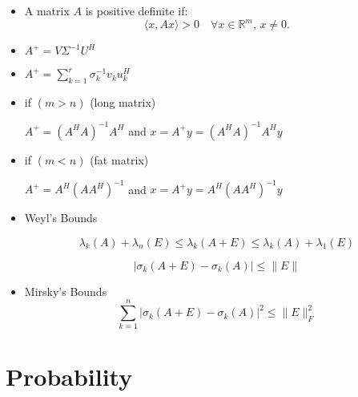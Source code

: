 \documentclass{article}
\begin{document}
\begin{itemize}
 \item A matrix $A$ is positive definite if:
        \[
        \langle x, Ax \rangle > 0 \quad \forall x \in \mathbb{R}^m, \, x \neq 0.
        \]



\item 
   $
    A^+ = V \Sigma^{-1} U^H
   $


\item 
$
A^+ = \sum_{k=1}^{r} \sigma_k^{-1} v_k u_k^H
$


\item if $(m > n)$ (long matrix)

    $
    A^+ = (A^H A)^{-1} A^H
    $ and $x = A^+y = (A^H A)^{-1} A^Hy$

\item if $(m < n)$ (fat matrix)

$
 A^+ = A^H(AA^H)^{-1}
$ and $x = A^+y = A^H(AA^H)^{-1}y$

\item Weyl's Bounds

\[
\lambda_k(A) + \lambda_n(E) \leq \lambda_k(A + E) \leq \lambda_k(A) + \lambda_1(E)
\]

\[
\lvert \sigma_k(A + E) - \sigma_k(A) \rvert \leq \lVert E \rVert
\]


\item Mirsky's Bounds
\[
\sum_{k=1}^{n} \lvert \sigma_k(A + E) - \sigma_k(A) \rvert^2 \leq \lVert E \rVert_F^2
\]

\end{itemize}


\section{Probability}
\end{document}
